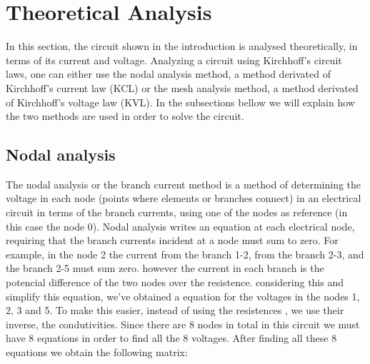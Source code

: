 \section{Theoretical Analysis}
\label{sec:analysis}


In this section, the circuit shown in the introduction is analysed
theoretically, in terms of its current and voltage.
Analyzing a circuit using Kirchhoff's circuit laws, one can either use the nodal analysis method, a method derivated of Kirchhoff's current law (KCL) or the mesh analysis method, a method derivated of Kirchhoff's voltage law (KVL).
In the subsections bellow we will explain how the two methods are used in order to solve the circuit. 



\subsection{Nodal analysis}

The nodal analysis or the branch current method is a method of determining the voltage in each node (points where elements or branches connect) in an electrical circuit in terms of the branch currents, using one of the nodes as reference (in this case the node 0). 
Nodal analysis writes an equation at each electrical node, requiring that the branch currents incident at a node must sum to zero. For example, in the node 2 the current from the branch 1-2, from the branch 2-3, and the branch 2-5 must sum zero. however the current in each branch is the potencial difference of the two nodes over the resistence. considering this and simplify this equation, we've obtained a equation for the voltages in the nodes 1, 2, 3 and 5. To make this easier, instead of using the resistences , we use their inverse, the condutivities. 
Since there are 8 nodes in total in this circuit we must have 8 equations in order to find all the 8 voltages. After finding all these 8 equations we obtain the following matrix: 

\setlength{\parskip}{2em}

